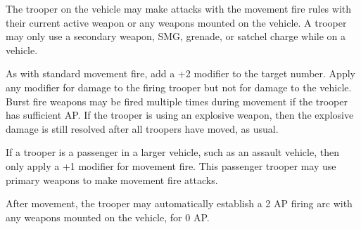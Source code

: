 The trooper on the vehicle may make attacks with the movement fire rules with their current active weapon or any weapons mounted on the vehicle.
A trooper may only use a secondary weapon, SMG, grenade, or satchel charge while on a vehicle.

As with standard movement fire, add a +2 modifier to the target number.
Apply any modifier for damage to the firing trooper but not for damage to the vehicle.
Burst fire weapons may be fired multiple times during movement if the trooper has sufficient AP.
If the trooper is using an explosive weapon, then the explosive damage is still resolved after all troopers have moved, as usual.

If a trooper is a passenger in a larger vehicle, such as an assault vehicle, then only apply a +1 modifier for movement fire.
This passenger trooper may use primary weapons to make movement fire attacks.

After movement, the trooper may automatically establish a 2 AP firing arc with any weapons mounted on the vehicle, for 0 AP.
